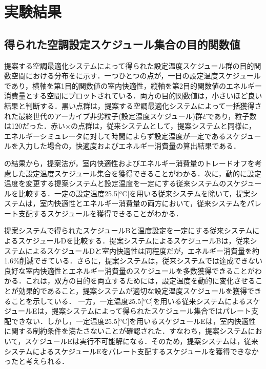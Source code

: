 \section{実験結果}
\subsection{得られた空調設定スケジュール集合の目的関数値}
提案する空調最適化システムによって得られた設定温度スケジュール群の目的関数空間における分布をに示す．一つひとつの点が，一日の設定温度スケジュールであり，横軸を第1目的関数値の室内快適性，縦軸を第2目的関数値のエネルギー消費量とする空間にプロットされている．両方の目的関数値は，小さいほど良い結果と判断する．黒い点群は，提案する空調最適化システムによって一括獲得された最終世代のアーカイブ非劣粒子(設定温度スケジュール)群$\mathcal{E}$であり，粒子数は120だった．赤い×の点群は，従来システムとして，提案システムと同様に，エネルギーシミュレータに対して時間によらず設定温度が一定であるスケジュールを入力した場合の，快適度およびエネルギー消費量の算出結果である．

の結果から，提案法が，室内快適性およびエネルギー消費量のトレードオフを考慮した設定温度スケジュール集合を獲得できることがわかる．次に，動的に設定温度を変更する提案システムと設定温度を一定にする従来システムのスケジュールを比較する．一定の設定温度25.5[$^o$C]を用いる従来システムを除いて，提案システムは，室内快適性とエネルギー消費量の両方において，従来システムをパレート支配するスケジュールを獲得できることがわかる．

提案システムで得られたスケジュールBと温度設定を一定にする従来システムによるスケジュールDを比較する．提案システムによるスケジュールBは，従来システムによるスケジュールDと室内快適性は同程度だが，エネルギー消費量を約1.6\%削減できている．さらに，提案システムは，従来システムでは達成できない良好な室内快適性とエネルギー消費量のスケジュールを多数獲得できることがわかる．これは，双方の目的を両立するためには，設定温度を動的に変化させることが効果的であること，提案システムが適切な設定温度スケジュールを獲得できることを示している．
一方，一定温度25.5[$^o$C]を用いる従来システムによるスケジュールEは，提案システムによって得られたスケジュール集合ではパレート支配できない．しかし，一定温度25.5[$^o$C]を用いるスケジュールEは，室内快適性に関する制約条件を満たさないことが確認された．すなわち，提案システムにおいて，スケジュールEは実行不可能解になる．そのため，提案システムは，従来システムによるスケジュールEをパレート支配するスケジュールを獲得できなかったと考えられる．


